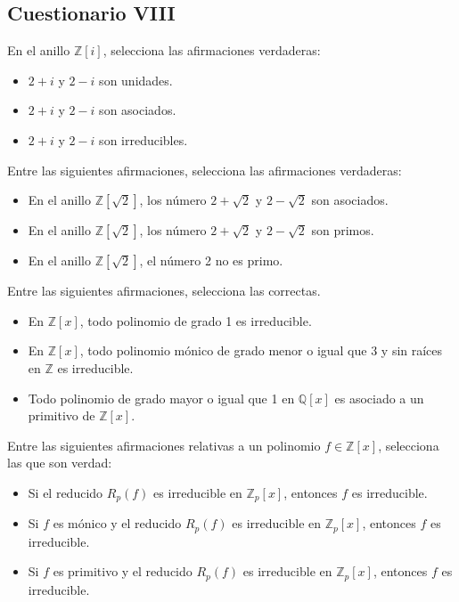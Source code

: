\subsection{Cuestionario VIII}

\begin{ejercicio}
    En el anillo $\mathbb{Z}[i]$, selecciona las afirmaciones verdaderas:
    \begin{itemize}
        \item $2+ i$ y $2-i$ son unidades.
        \item $2+i$ y $2-i$ son asociados.
        \item $2+i$ y $2-i$ son irreducibles.
    \end{itemize}
\end{ejercicio}

\begin{ejercicio}
    Entre las siguientes afirmaciones, selecciona las afirmaciones verdaderas:
    \begin{itemize}
        \item En el anillo $\mathbb{Z}\left[\sqrt{2}\right]$, los número $2+\sqrt{2}$ y $2-\sqrt{2}$ son asociados.
        \item En el anillo $\mathbb{Z}\left[\sqrt{2}\right]$, los número $2+\sqrt{2}$ y $2-\sqrt{2}$ son primos.
        \item En el anillo $\mathbb{Z}\left[\sqrt{2}\right]$, el número 2 no es primo.
    \end{itemize}
\end{ejercicio}

\begin{ejercicio}
    Entre las siguientes afirmaciones, selecciona las correctas.
    \begin{itemize}
        \item En $\mathbb{Z}[x]$, todo polinomio de grado 1 es irreducible.
        \item En $\mathbb{Z}[x]$, todo polinomio mónico de grado menor o igual que 3 y sin raíces en $\mathbb{Z}$ es irreducible.
        \item Todo polinomio de grado mayor o igual que 1 en $\mathbb{Q}[x]$ es asociado a un primitivo de $\mathbb{Z}[x]$.
    \end{itemize}
\end{ejercicio}

\begin{ejercicio}
    Entre las siguientes afirmaciones relativas a un polinomio $f\in \mathbb{Z}[x]$, selecciona las que son verdad:
    \begin{itemize}
        \item Si el reducido $R_p(f)$ es irreducible en $\mathbb{Z}_p[x]$, entonces $f$ es irreducible.
        \item Si $f$ es mónico y el reducido $R_p(f)$ es irreducible en $\mathbb{Z}_p[x]$, entonces $f$ es irreducible.
        \item Si $f$ es primitivo y el reducido $R_p(f)$ es irreducible en $\mathbb{Z}_p[x]$, entonces $f$ es irreducible.
    \end{itemize}
\end{ejercicio}

